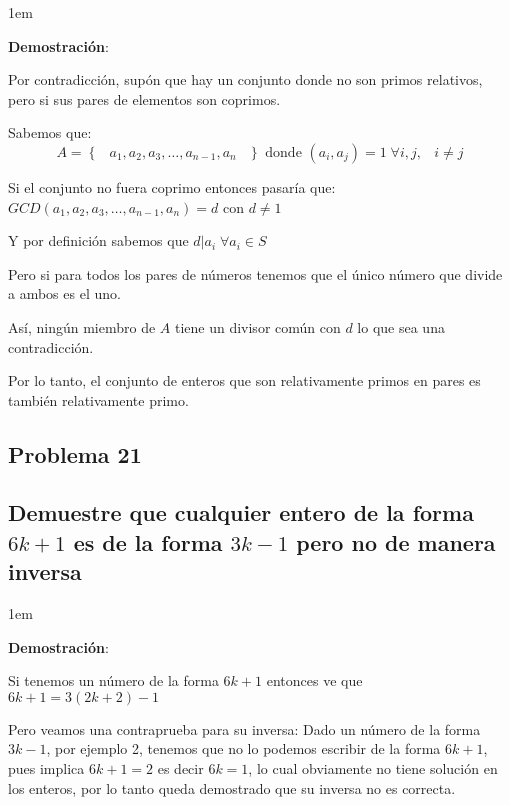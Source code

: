 \documentclass[12pt, fleqn]{article}                             %
\newenvironment{SmallIndentation}[1][0.75em]                    %
    {\begin{adjustwidth}{#1}{}\begin{footnotesize}}                 %
    {\end{footnotesize}\end{adjustwidth}}                           %
\DeclareMathOperator \Space {\quad}                             %
\DeclareMathOperator \MiniSpace {\;}                            %
\newcommand{\Set}[1]{\left\{ \MiniSpace #1 \MiniSpace \right\}} %
\begin{document}
        \begin{SmallIndentation}[1em]
            \textbf{Demostración}:

            Por contradicción, supón que hay un conjunto donde no son primos 
            relativos, pero si sus pares de elementos son coprimos.

            Sabemos que:
            \begin{equation*}
                A = \Set{a_1, a_2, a_3,\dots, a_{n-1}, a_n}
                \text{ donde } 
                (a_i,a_j) = 1 \; \forall i,j, \MiniSpace i \neq j
            \end{equation*}

            Si el conjunto no fuera coprimo entonces pasaría que:
            $GCD(a_1, a_2, a_3,\dots, a_{n-1}, a_n) = d$ con $d \neq 1$

            Y por definición sabemos que $d|a_i \; \forall a_i \in S$

            Pero si para todos los pares de números tenemos que el único número que 
            divide a ambos es el uno.

            Así, ningún miembro de $A$ tiene un divisor común con $d$ lo que sea
            una contradicción.

            Por lo tanto, el conjunto de enteros que son relativamente primos
            en pares es también relativamente primo.

        \end{SmallIndentation}

    \subsection{Problema 21}
    \subsection*{Demuestre que cualquier entero de la forma $6k+1$ es de la forma $3k-1$
        pero no de manera inversa}


        \begin{SmallIndentation}[1em]
            \textbf{Demostración}:

            Si tenemos un número de la forma $6k+1$ entonces ve que $6k+1 = 3(2k+2)-1$

            Pero veamos una contraprueba para su inversa:
            Dado un número de la forma $3k-1$, por ejemplo 2, tenemos que no lo
            podemos escribir de la forma $6k+1$, pues implica $6k+1=2$ es decir
            $6k=1$, lo cual obviamente no tiene solución en los enteros, por lo tanto
            queda demostrado que su inversa no es correcta.
            
        \end{SmallIndentation}
\end{document}
